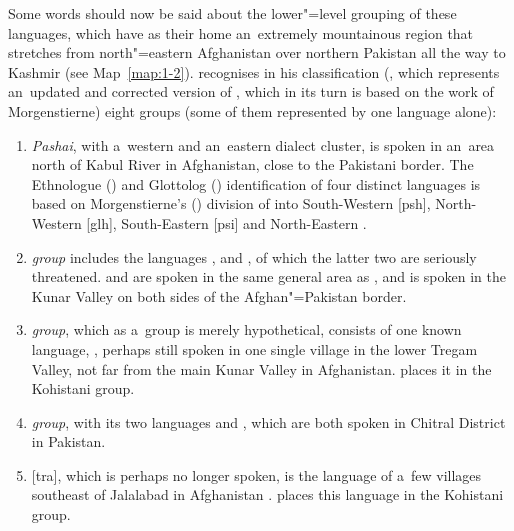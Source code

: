 \largerpage[-1]
Some words should now be said about the lower"=level grouping of these \iliHKIA languages, which have as their home an~extremely mountainous region that stretches from north"=eastern Afghanistan over northern Pakistan all the way to Kashmir (see Map~\ref{map:1-2}). \citeauthor{strand2001} recognises in his classification (\citeyear[258]{strand2001}, which represents an~updated and corrected version of \citealt{strand1973}, which in its turn is based on the work of Morgenstierne) eight groups (some of them represented by one language alone): 

\largerpage[-1]
\begin{enumerate}
\item \textit{Pashai}, with a~western and an~eastern dialect cluster, is spoken in an~area north of Kabul River in Afghanistan, close to the Pakistani border. The Ethnologue (\citeyear{ethnologue2015}) and Glottolog (\citeyear{glottolog2015}) identification of four distinct \iliPashai languages is based on Morgenstierne's (\citeyear{morgenstierne_pashai1973}) division of \iliPashai into South-Western [psh], North-Western [glh], South-Eastern [psi] and North-Eastern \iliPashai [aee].


\item \textit{\iliPech group} includes the languages \iliGawarbati [gwt], \iliGrangali [nli] and \iliShumashti [sts], of which the latter two are seriously threatened. \iliGrangali and \iliShumashti are spoken in the same general area as \iliPashai, and \iliGawarbati is spoken in the Kunar Valley on both sides of the Afghan"=Pakistan border. 


\item \textit{\iliPechKunar group}, which as a~group is merely hypothetical, consists of one known language, \iliKatarqalai [wsv] \citep{buddruss1960}, perhaps still spoken in one single village in the lower Tregam Valley, not far from the main Kunar Valley in Afghanistan. \citet[825]{bashir2003} places it in the Kohistani group.


\item \textit{\iliChitral group}, with its two languages \iliKhowar [khw] and \iliKalasha [kls], which are both spoken in Chitral District in Pakistan.


\item \textit{\iliTirahi} [tra], which is perhaps no longer spoken, is the language of a~few villages southeast of Jalalabad in Afghanistan \citep{morgenstierne_tirahi1934}. \citet[824]{bashir2003} places this language in the Kohistani group.



\end{enumerate}
